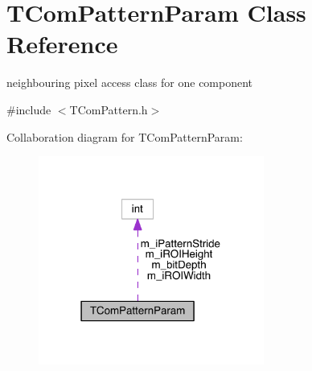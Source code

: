 \hypertarget{class_t_com_pattern_param}{}\section{T\+Com\+Pattern\+Param Class Reference}
\label{class_t_com_pattern_param}


neighbouring pixel access class for one component  




{\ttfamily \#include $<$T\+Com\+Pattern.\+h$>$}



Collaboration diagram for T\+Com\+Pattern\+Param\+:
\nopagebreak
\begin{figure}[H]
\begin{center}
\leavevmode
\includegraphics[width=210pt]{d9/d0c/class_t_com_pattern_param__coll__graph}
\end{center}
\end{figure}
